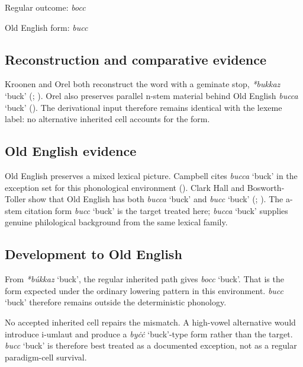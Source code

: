 \documentclass[
  british,
  a4paper,
  openany]{book}
\providecommand{\Recon}[1]{\emph{*#1}}
{\catcode`→=\active \global\def→{\ensuremath{\rightarrow}}}
\providecommand{\Recon}[1]{\emph{*#1}}
{\catcode`→=\active \global\def→{\ensuremath{\rightarrow}}}
\begin{document}
Regular outcome: \emph{bocc}

Old English form: \emph{bucc}

\subsection{Reconstruction and comparative
evidence}\label{reconstruction-and-comparative-evidence-142}

Kroonen and Orel both reconstruct the word with a geminate stop,
{\Recon{bukkaz} `buck'} (;
). Orel also preserves parallel
n-stem material behind Old English {\emph{bucca}} `buck'
(). The derivational input
therefore remains identical with the lexeme label: no alternative
inherited cell accounts for the form.

\subsection{Old English evidence}\label{old-english-evidence-142}

Old English preserves a mixed lexical picture. Campbell cites
{\emph{bucca}} `buck' in the exception set for this phonological
environment ().
Clark Hall and Bosworth-Toller show that Old English has both
{\emph{bucca}} `buck' and {\emph{bucc}} `buck'
(;
). The
a-stem citation form {\emph{bucc}} `buck' is the target treated here;
{\emph{bucca}} `buck' supplies genuine philological background from the
same lexical family.

\subsection{Development to Old
English}\label{development-to-old-english-142}

From {\Recon{búkkaz} `buck'}, the regular inherited path gives
{\emph{bocc}} `buck'. That is the form expected under the ordinary
lowering pattern in this environment. {\emph{bucc}} `buck' therefore
remains outside the deterministic phonology.

No accepted inherited cell repairs the mismatch. A high-vowel
alternative would introduce i-umlaut and produce a {\emph{byċċ}}
`buck'-type form rather than the target. {\emph{bucc}} `buck' is
therefore best treated as a documented exception, not as a regular
paradigm-cell survival.
\end{document}
